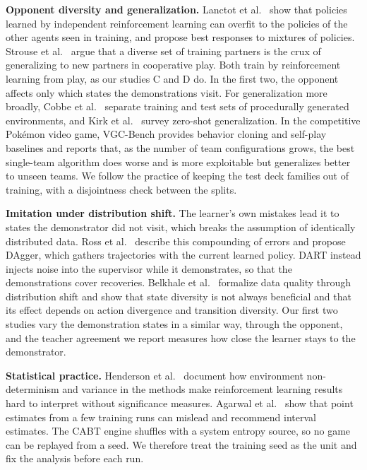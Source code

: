\documentclass[conference]{IEEEtran}
\begin{document}
\textbf{Opponent diversity and generalization.} Lanctot et al.\ \cite{Lanctot17} show that policies learned by independent reinforcement learning can overfit to the policies of the other agents seen in training, and propose best responses to mixtures of policies. Strouse et al.\ \cite{Strouse21} argue that a diverse set of training partners is the crux of generalizing to new partners in cooperative play. Both train by reinforcement learning from play, as our studies C and D do. In the first two, the opponent affects only which states the demonstrations visit. For generalization more broadly, Cobbe et al.\ \cite{Cobbe19} separate training and test sets of procedurally generated environments, and Kirk et al.\ \cite{Kirk23} survey zero-shot generalization. In the competitive Pok\'emon video game, VGC-Bench \cite{Angliss26} provides behavior cloning and self-play baselines and reports that, as the number of team configurations grows, the best single-team algorithm does worse and is more exploitable but generalizes better to unseen teams. We follow the practice of keeping the test deck families out of training, with a disjointness check between the splits.

\textbf{Imitation under distribution shift.} The learner's own mistakes lead it to states the demonstrator did not visit, which breaks the assumption of identically distributed data. Ross et al.\ \cite{Ross11} describe this compounding of errors and propose DAgger, which gathers trajectories with the current learned policy. DART \cite{Laskey17} instead injects noise into the supervisor while it demonstrates, so that the demonstrations cover recoveries. Belkhale et al.\ \cite{Belkhale23} formalize data quality through distribution shift and show that state diversity is not always beneficial and that its effect depends on action divergence and transition diversity. Our first two studies vary the demonstration states in a similar way, through the opponent, and the teacher agreement we report measures how close the learner stays to the demonstrator.

\textbf{Statistical practice.} Henderson et al.\ \cite{Henderson18} document how environment non-determinism and variance in the methods make reinforcement learning results hard to interpret without significance measures. Agarwal et al.\ \cite{Agarwal21} show that point estimates from a few training runs can mislead and recommend interval estimates. The CABT engine shuffles with a system entropy source, so no game can be replayed from a seed. We therefore treat the training seed as the unit and fix the analysis before each run.
\end{document}
